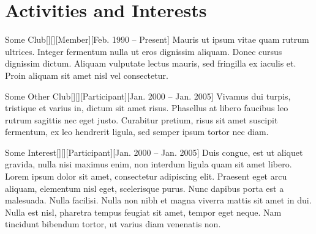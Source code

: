 \documentclass{kres}
\begin{document}
\section{Activities and Interests}
\begin{entry}{Some Club}[][][Member][Feb. 1990 -- Present]
Mauris ut ipsum vitae quam rutrum ultrices. Integer fermentum nulla ut eros dignissim aliquam. Donec cursus dignissim dictum. Aliquam vulputate lectus mauris, sed fringilla ex iaculis et. Proin aliquam sit amet nisl vel consectetur.
\end{entry}
\begin{entry}{Some Other Club}[][][Participant][Jan. 2000 -- Jan. 2005]
Vivamus dui turpis, tristique et varius in, dictum sit amet risus. Phasellus at libero faucibus leo rutrum sagittis nec eget justo. Curabitur pretium, risus sit amet suscipit fermentum, ex leo hendrerit ligula, sed semper ipsum tortor nec diam.
\end{entry}
\begin{entry}{Some Interest}[][][Participant][Jan. 2000 -- Jan. 2005]
 Duis congue, est ut aliquet gravida, nulla nisi maximus enim, non interdum ligula quam sit amet libero. Lorem ipsum dolor sit amet, consectetur adipiscing elit. Praesent eget arcu aliquam, elementum nisl eget, scelerisque purus. Nunc dapibus porta est a malesuada. Nulla facilisi. Nulla non nibh et magna viverra mattis sit amet in dui. Nulla est nisl, pharetra tempus feugiat sit amet, tempor eget neque. Nam tincidunt bibendum tortor, ut varius diam venenatis non.
\end{entry}
\end{document}
